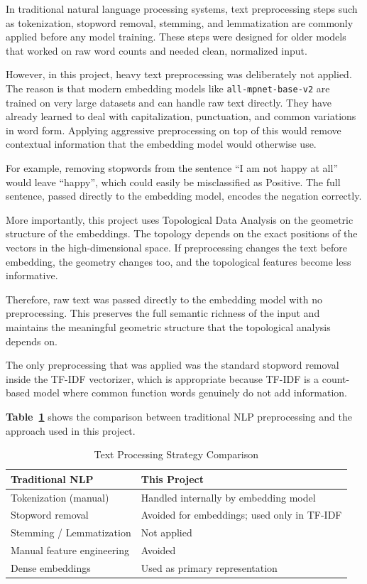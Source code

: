 In traditional natural language processing systems, text preprocessing steps such as
tokenization, stopword removal, stemming, and lemmatization are commonly applied before any
model training. These steps were designed for older models that worked on raw word counts and
needed clean, normalized input.

However, in this project, heavy text preprocessing was deliberately not applied. The reason
is that modern embedding models like \texttt{all-mpnet-base-v2} are trained on very large
datasets and can handle raw text directly. They have already learned to deal with capitalization,
punctuation, and common variations in word form. Applying aggressive preprocessing on top of
this would remove contextual information that the embedding model would otherwise use.

For example, removing stopwords from the sentence ``I am not happy at all'' would leave
``happy'', which could easily be misclassified as Positive. The full sentence, passed directly
to the embedding model, encodes the negation correctly.

More importantly, this project uses Topological Data Analysis on the geometric structure of the
embeddings. The topology depends on the exact positions of the vectors in the high-dimensional
space. If preprocessing changes the text before embedding, the geometry changes too, and the
topological features become less informative.

Therefore, raw text was passed directly to the embedding model with no preprocessing.
This preserves the full semantic richness of the input and maintains the meaningful geometric
structure that the topological analysis depends on.

The only preprocessing that was applied was the standard stopword removal inside the TF-IDF
vectorizer, which is appropriate because TF-IDF is a count-based model where common function
words genuinely do not add information.

\textbf{Table~\ref{tab:text_proc}} shows the comparison between traditional NLP preprocessing and the
approach used in this project.

\begin{table}[H]
\centering
\caption{Text Processing Strategy Comparison}
\label{tab:text_proc}
\begin{tabular}{ll}
\toprule
\textbf{Traditional NLP} & \textbf{This Project} \\
\midrule
Tokenization (manual) & Handled internally by embedding model \\
Stopword removal & Avoided for embeddings; used only in TF-IDF \\
Stemming / Lemmatization & Not applied \\
Manual feature engineering & Avoided \\
Dense embeddings & Used as primary representation \\
\bottomrule
\end{tabular}
\end{table}

